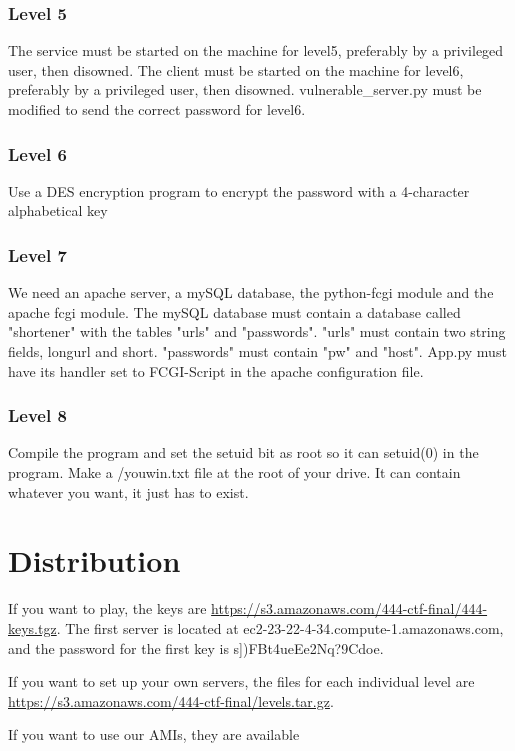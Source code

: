 \documentclass[12pt]{article}
\begin{document}
\subsubsection{Level 5}
The service must be started on the machine for level5, preferably by a privileged user, then disowned.  The client must be started on the machine for level6, preferably by a privileged user, then disowned.  vulnerable\_server.py must be modified to send the correct password for level6.
\subsubsection{Level 6}
Use a DES encryption program  to encrypt the password with a 4-character
alphabetical key
\subsubsection{Level 7}
We need an apache server, a mySQL database, the python-fcgi module and the apache fcgi module.  The mySQL database must contain a database called "shortener" with the tables "urls" and "passwords".  "urls" must contain two string fields, longurl and short.  "passwords" must contain "pw" and "host".  App.py must have its handler set to FCGI-Script in the apache configuration file.
\subsubsection{Level 8}
Compile the program and set the setuid bit as root so it can setuid(0) in the
program. Make a /youwin.txt file at the root of your drive. It can contain
whatever you want, it just has to exist.
\section{Distribution}
If you want to play, the keys are \hyperref[here]{https://s3.amazonaws.com/444-ctf-final/444-keys.tgz}.  The first server is located at ec2-23-22-4-34.compute-1.amazonaws.com, and the password for the first key is s])FBt4ueEe2Nq?9Cdoe.

If you want to set up your own servers, the files for each individual level are \hyperref[here]{https://s3.amazonaws.com/444-ctf-final/levels.tar.gz}.

If you want to use our AMIs, they are available 
\end{document}

